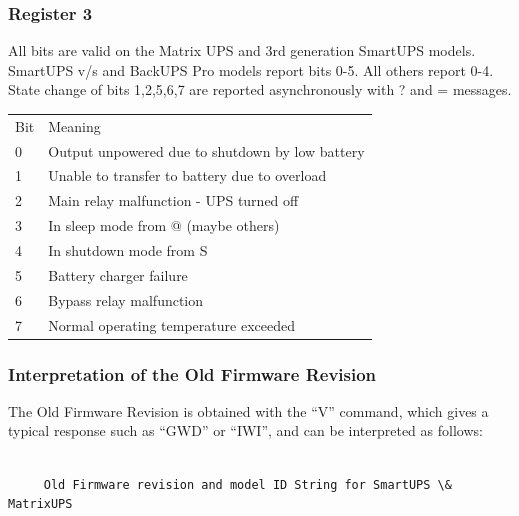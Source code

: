 {{{{{{{{{{{{{{{{{\begin{longtable}{ll}
\end{longtable}

\label{Register-3}

\subsubsection*{Register 3}

All bits are valid on the Matrix UPS and 3rd generation SmartUPS models.
SmartUPS v/s and BackUPS Pro models report bits 0-5. All others report 0-4.
State change of bits 1,2,5,6,7 are reported asynchronously with ? and =
messages.  

\begin{longtable}{ll}
{Bit} & {Meaning 
 } \\
{0} & {Output unpowered due to shutdown by low battery 
 } \\
{1} & {Unable to transfer to battery due to overload 
 } \\
{2} & {Main relay malfunction - UPS turned off 
 } \\
{3} & {In sleep mode from @ (maybe others) 
 } \\
{4} & {In shutdown mode from S 
 } \\
{5} & {Battery charger failure 
 } \\
{6} & {Bypass relay malfunction 
 } \\
{7} & {Normal operating temperature exceeded  
}

\end{longtable}

\label{Interpretation-of-the-Old-Firmware-Revision}

\subsubsection*{Interpretation of the Old Firmware Revision}

The Old Firmware Revision is obtained with the ``V'' command, which gives a
typical response such as ``GWD'' or ``IWI'', and can be interpreted as
follows: 

\footnotesize
\begin{verbatim}
     
     Old Firmware revision and model ID String for SmartUPS \& MatrixUPS
     

\end{verbatim}}}}}}}}}}}}}}}}}}
